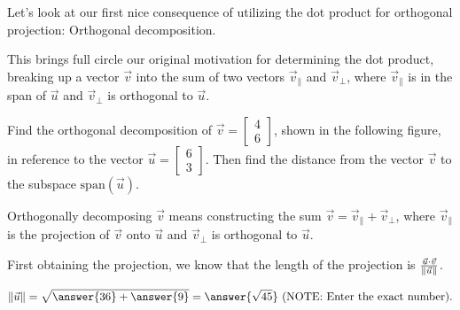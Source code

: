 \documentclass{ximera}
\begin{document}
\begin{exploration}
   Let's look at our first nice consequence of utilizing the dot product for orthogonal projection: Orthogonal decomposition.

   This brings full circle our original motivation for determining the dot product, breaking up a vector $\vec{v}$ into the sum of two vectors $\vec{v}_\parallel$ and $\vec{v}_\perp$, where $\vec{v}_\parallel$ is in the span of $\vec{u}$ and $\vec{v}_\perp$ is orthogonal to $\vec{u}$.

   \begin{example}\label{ex:projection1}
      Find the orthogonal decomposition of $\vec{v}=\begin{bmatrix}
      4\\6
      \end{bmatrix}$, shown in the following figure, in reference to the vector $\vec{u}=\begin{bmatrix}
         6\\3
      \end{bmatrix}$. Then find the distance from the vector $\vec{v}$ to the subspace $\mbox{span}(\vec{u})$.
       
      \begin{center}
      \end{center}
       
      Orthogonally decomposing $\vec{v}$ means constructing the sum $\vec{v}=\vec{v}_\parallel+\vec{v}_\perp$, where $\vec{v}_\parallel$ is the projection of $\vec{v}$ onto $\vec{u}$ and $\vec{v}_\perp$ is orthogonal to $\vec{u}$.

      First obtaining the projection, we know that the length of the projection is $\frac{\vec{u}\cdot\vec{v}}{\left\|\vec{u}\right\|}$. 

      $$\norm{\vec{u}}=\sqrt{\answer{36}+\answer{9}}=\answer{\sqrt{45}}\text{ (NOTE: Enter the exact number)}.$$


\end{example}
\end{exploration}
\end{document}
